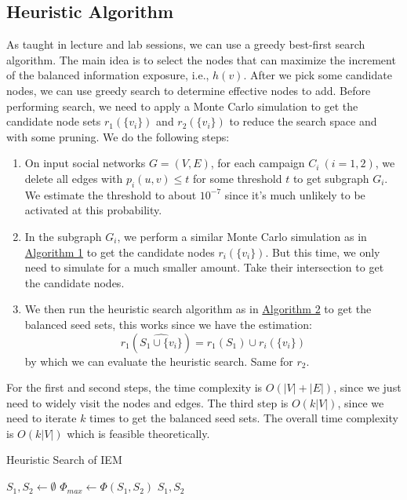 \documentclass{article}
\begin{document}
\subsection{Heuristic Algorithm}
As taught in lecture and lab sessions, we can use a greedy best-first search algorithm. The main idea is to select the nodes that can maximize the increment of the balanced information exposure, i.e., $h(v)$. After we pick some candidate nodes, we can use greedy search to determine effective nodes to add.
Before performing search, we need to apply a Monte Carlo simulation to get the candidate node sets $r_1(\{v_i\})$ and $r_2(\{v_i\})$ to reduce the search space and with some pruning. We do the following steps:

\begin{enumerate}
    \item On input social networks $G = (V, E)$, for each campaign $C_i\ (i = 1, 2)$, we delete all edges with $p_i(u, v) \le t$ for some threshold $t$ to get subgraph $G_i$. We estimate the threshold to about $10^{-7}$ since it's much unlikely to be activated at this probability.
    \item In the subgraph $G_i$, we perform a similar Monte Carlo simulation as in \hyperlink{alg:monte-carlo}{Algorithm 1} to get the candidate nodes $r_i(\{v_i\})$. But this time, we only need to simulate for a much smaller amount. Take their intersection to get the candidate nodes.
    \item We then run the heuristic search algorithm as in \hyperlink{alg:heuristic}{Algorithm 2} to get the balanced seed sets, this works since we have the estimation: \[ r_1(\widehat{S_1\cup \{v_i\}}) = r_1(S_1) \cup r_i(\{v_i\}) \] by which we can evaluate the heuristic search. Same for $r_2$.
\end{enumerate}

For the first and second steps, the time complexity is $O(|V| + |E|)$, since we just need to widely visit the nodes and edges. The third step is $O(k|V|)$, since we need to iterate $k$ times to get the balanced seed sets. The overall time complexity is $O(k|V|)$ which is feasible theoretically.

\begin{algorithm}
\caption{Heuristic Search of IEM}\label{alg:heuristic}
$S_1, S_2 \leftarrow \emptyset$\;
$\Phi_{max} \leftarrow \Phi \left( S_1, S_2 \right)$\;
\Return $S_1, S_2$\;
\end{algorithm}
\end{document}
